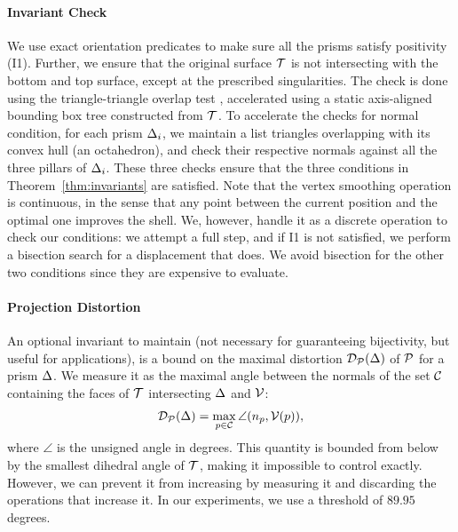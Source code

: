\paragraph{Invariant Check}
We use exact orientation predicates \cite{shewchuk1997adaptive} to make sure all the prisms satisfy positivity (I1). Further, we ensure that the original surface $\T$ is not intersecting with the bottom and top surface, except at the prescribed singularities.
The check is done using the triangle-triangle overlap test \cite{guigue2003fast}, accelerated using a static axis-aligned bounding box tree constructed from $\T$. 
To accelerate the checks for normal condition, 
for each prism $\Prism_i$, 
we maintain a list triangles overlapping with its convex hull (an octahedron), 
and check their respective normals against all the three pillars of $\Prism_i$. These three checks ensure that the three conditions in  Theorem~\ref{thm:invariants} are satisfied.
%
Note that the vertex smoothing operation is continuous, in the sense that any point between the current position and the optimal one improves the shell. 
We, however, handle it as a discrete operation to check our conditions: we attempt a full step, and if I1 is not satisfied, we perform a bisection search for a displacement that does. We avoid bisection for the other two conditions since they are expensive to evaluate.



\paragraph{Projection Distortion} 
An optional invariant to maintain (not {necessary} for guaranteeing bijectivity, but useful for applications), 
is a bound  on the maximal distortion $\D_\P(\Prism) $ of $\P$ for a prism $\Prism$. 
We measure it as  the maximal angle between the normals of the set $\C$ containing the faces of $\T$ intersecting $\Prism$ and $\V$:
\begin{equation*}
    \D_\P(\Prism) = \max_{p \in \C} \angle (n_p, \V(p)),
\end{equation*}
where $\angle$ is the unsigned angle in degrees. This quantity is bounded from below by the smallest dihedral angle of $\T$, making it impossible to control exactly. However, we can prevent it from increasing by measuring it and discarding the operations that increase it. In our experiments, we use a threshold of $89.95$ degrees.

